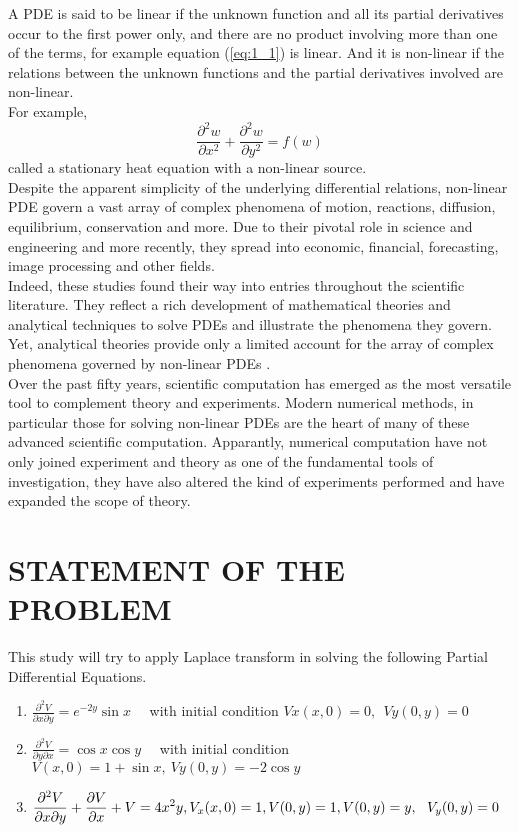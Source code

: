 \documentclass[11pt]{report}
\newcommand{\sps}{\\[0.2cm]}
\newcommand{\refn}[1]{(\ref{#1})}
\newcommand{\refx}[1]{\refn{eq:#1}}
\newcommand{\dsp}{\displaystyle}
\newcommand{\PDE}{PDE }
\newcommand{\PDEs}{PDEs }
\begin{document}
	A \PDE is said to be linear if the unknown function and all its partial derivatives occur to the first power only, and there are no product involving more than one of the terms, for example equation \refx{1_1} is linear. And it is non-linear if the relations between the unknown functions and the partial derivatives involved are non-linear.\sps
	For example,
	\begin{equation}
		\frac{\partial^2w}{\partial x^2}+\frac{\partial^2w}{\partial y^2} = f(w)
		\label{eq:1_2}
	\end{equation}
	called a stationary heat equation with a non-linear source.\sps
	
	Despite the apparent simplicity of the underlying differential relations, non-linear \PDE govern a vast array of complex phenomena of motion, reactions, diffusion, equilibrium, conservation and more. Due to their pivotal role in science and engineering and more recently, they spread into economic, financial, forecasting, image processing and other fields.\\
	
	Indeed, these studies found their way into entries throughout the scientific literature. They reflect a rich development of mathematical theories and analytical techniques to solve \PDEs  and illustrate the phenomena they govern. Yet, analytical theories provide only a limited account for the array of complex phenomena governed by non-linear \PDEs.\\
	
	Over the past fifty years, scientific computation has emerged as the most versatile tool to complement theory and experiments. Modern numerical methods, in particular those for solving non-linear \PDEs are the heart of many of these advanced scientific computation. Apparantly, numerical computation have not only joined experiment and theory as one of the fundamental tools of investigation, they have also altered the kind of experiments performed and have expanded the scope of theory.
	
	\section{STATEMENT OF THE PROBLEM}
	This study will try to apply Laplace transform in solving the following Partial Differential Equations.\\
	\begin{enumerate}
		\item $\dsp \frac{\partial^2 V}{\partial x\partial y} = e^{-2y}\sin x$ ~~with initial condition $Vx(x,0)=0, ~~Vy(0,y) =0$
		\item $\dsp \frac{\partial^2 V}{\partial y \partial x}= \cos x \cos y$~~ with initial condition $V(x,0)=1+\sin x, ~ Vy(0,y)=-2\cos y$
		\item $\dsp\frac{\partial^2 V}{\partial x \partial y} + \frac{\partial V}{\partial x} + V = 4x^2y, V_x(x,0)=1, V(0,y)=1, V(0,y)=y, ~~~\\V_y(0,y)=0$
	\end{enumerate}
\end{document}
